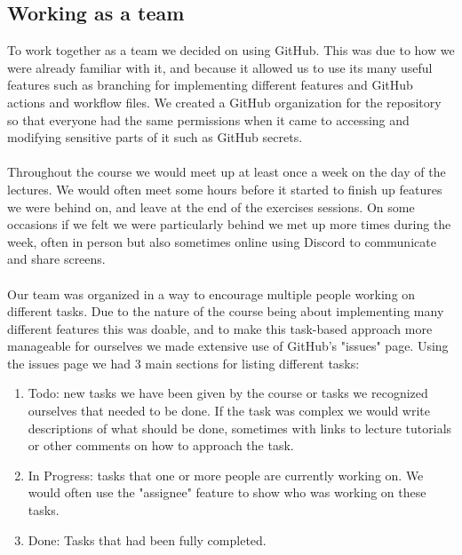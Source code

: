 \subsection*{Working as a team}
To work together as a team we decided on using GitHub. This was due to how we were already familiar with it, and because it allowed us to use its many useful features such as branching for implementing different features and GitHub actions and workflow files. We created a GitHub organization for the repository so that everyone had the same permissions when it came to accessing and modifying sensitive parts of it such as GitHub secrets.
\\\\
Throughout the course we would meet up at least once a week on the day of the lectures. We would often meet some hours before it started to finish up features we were behind on, and leave at the end of the exercises sessions. On some occasions if we felt we were particularly behind we met up more times during the week, often in person but also sometimes online using Discord to communicate and share screens.
\\\\
Our team was organized in a way to encourage multiple people working on different tasks. Due to the nature of the course being about implementing many different features this was doable, and to make this task-based approach more manageable for ourselves we made extensive use of GitHub's "issues" page. Using the issues page we had 3 main sections for listing different tasks:

\begin{enumerate}
    \item Todo: new tasks we have been given by the course or tasks we recognized ourselves that needed to be done. If the task was complex we would write descriptions of what should be done, sometimes with links to lecture tutorials or other comments on how to approach the task.
    \item In Progress: tasks that one or more people are currently working on. We would often use the "assignee" feature to show who was working on these tasks.
    \item Done: Tasks that had been fully completed.
\end{enumerate}

